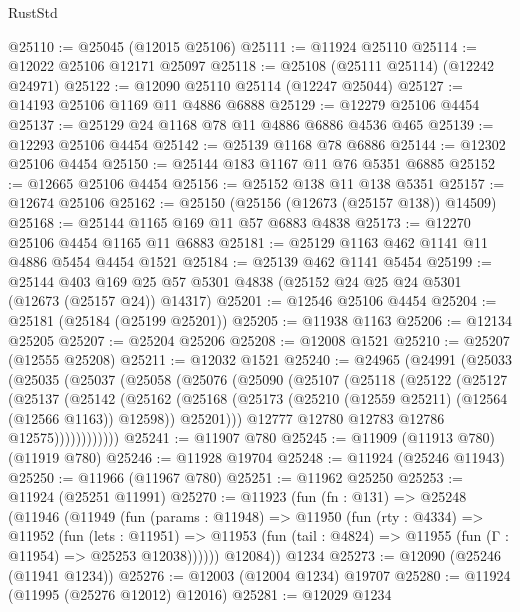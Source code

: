 \begin{lexlean}{RustStd}
\begin{coremodule}
@25110 := @25045 (@12015 @25106)
@25111 := @11924 @25110
@25114 := @12022 @25106 @12171 @25097
@25118 := @25108 (@25111 @25114) (@12242 @24971)
@25122 := @12090 @25110 @25114 (@12247 @25044)
@25127 := @14193 @25106 @1169 @11 @4886 @6888
@25129 := @12279 @25106 @4454
@25137 := @25129 @24 @1168 @78 @11 @4886 @6886 @4536 @465
@25139 := @12293 @25106 @4454
@25142 := @25139 @1168 @78 @6886
@25144 := @12302 @25106 @4454
@25150 := @25144 @183 @1167 @11 @76 @5351 @6885
@25152 := @12665 @25106 @4454
@25156 := @25152 @138 @11 @138 @5351
@25157 := @12674 @25106
@25162 := @25150 (@25156 (@12673 (@25157 @138)) @14509)
@25168 := @25144 @1165 @169 @11 @57 @6883 @4838
@25173 := @12270 @25106 @4454 @1165 @11 @6883
@25181 := @25129 @1163 @462 @1141 @11 @4886 @5454 @4454 @1521
@25184 := @25139 @462 @1141 @5454
@25199 := @25144
    @403
    @169
    @25
    @57
    @5301
    @4838
    (@25152 @24 @25 @24 @5301 (@12673 (@25157 @24)) @14317)
@25201 := @12546 @25106 @4454
@25204 := @25181 (@25184 (@25199 @25201))
@25205 := @11938 @1163
@25206 := @12134 @25205
@25207 := @25204 @25206
@25208 := @12008 @1521
@25210 := @25207 (@12555 @25208)
@25211 := @12032 @1521
@25240 := @24965
    (@24991
      (@25033
        (@25035
          (@25037
            (@25058
              (@25076
                (@25090
                  (@25107
                    (@25118
                      (@25122
                        (@25127
                          (@25137
                            (@25142
                              (@25162
                                (@25168
                                  (@25173 (@25210 (@12559 @25211) (@12564 (@12566 @1163)) @12598))
                                  @25201)))
                            @12777
                            @12780
                            @12783
                            @12786
                            @12575))))))))))))
@25241 := @11907 @780
@25245 := @11909 (@11913 @780) (@11919 @780)
@25246 := @11928 @19704
@25248 := @11924 (@25246 @11943)
@25250 := @11966 (@11967 @780)
@25251 := @11962 @25250
@25253 := @11924 (@25251 @11991)
@25270 := @11923
    (fun (fn : @131) =>
    @25248
      (@11946
        (@11949
          (fun (params : @11948) =>
          @11950
            (fun (rty : @4334) =>
            @11952
              (fun (lets : @11951) =>
              @11953 (fun (tail : @4824) => @11955 (fun (Γ : @11954) => @25253 @12038))))))
        @12084))
    @1234
@25273 := @12090 (@25246 (@11941 @1234))
@25276 := @12003 (@12004 @1234) @19707
@25280 := @11924 (@11995 (@25276 @12012) @12016)
@25281 := @12029 @1234

\end{coremodule}
\end{lexlean}
